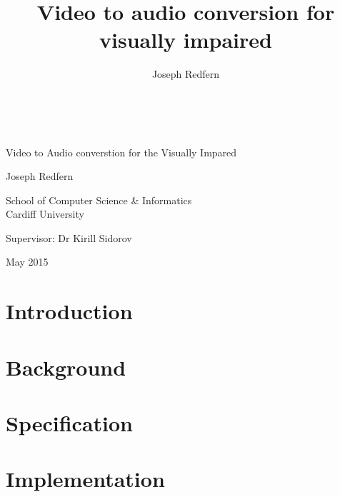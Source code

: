 \documentclass[11pt,a4paper]{memoir}
\author{Joseph Redfern}
\title{Video to audio conversion for visually impaired}
\date{}
\begin{document}
\thispagestyle{empty}

{%
\sffamily
\centering
\Large

~\vspace{\fill}

{\huge 
    Video to Audio converstion for the Visually Impared
}

\vspace{2.5cm}

{\LARGE
    Joseph Redfern
}

\vspace{3.5cm}

School of Computer Science \& Informatics\\
Cardiff University

\vspace{3.5cm}

Supervisor: Dr Kirill Sidorov 

\vspace{\fill}

May 2015

}

\cleardoublepage



\clearpage

\tableofcontents*

\clearpage

\lstlistoflistings

\clearpage

\chapter{Introduction}


\chapter{Background}


\chapter{Specification}

\chapter{Implementation}

\clearpage



\clearpage
\printbibliography
\end{document}
